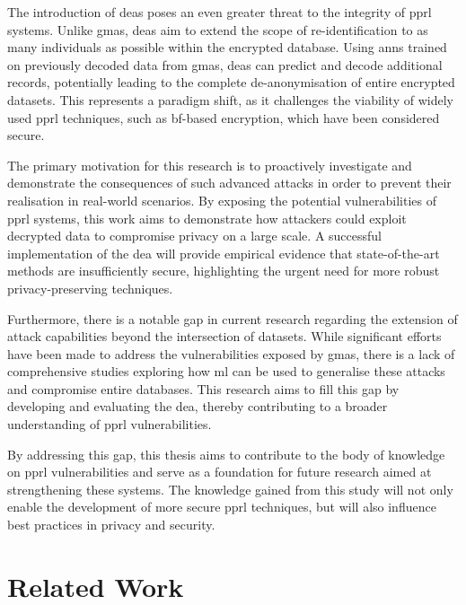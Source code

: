 The introduction of \ac{dea}s poses an even greater threat to the integrity of \ac{pprl} systems. 
Unlike \ac{gma}s, \ac{dea}s aim to extend the scope of re-identification to as many individuals as possible within the encrypted database. 
Using \ac{ann}s trained on previously decoded data from \ac{gma}s, \ac{dea}s can predict and decode additional records, potentially leading to the complete de-anonymisation of entire encrypted datasets. 
This represents a paradigm shift, as it challenges the viability of widely used \ac{pprl} techniques, such as \ac{bf}-based encryption, which have been considered secure.

The primary motivation for this research is to proactively investigate and demonstrate the consequences of such advanced attacks in order to prevent their realisation in real-world scenarios. 
By exposing the potential vulnerabilities of \ac{pprl} systems, this work aims to demonstrate how attackers could exploit decrypted data to compromise privacy on a large scale. 
A successful implementation of the \ac{dea} will provide empirical evidence that state-of-the-art methods are insufficiently secure, highlighting the urgent need for more robust privacy-preserving techniques.

Furthermore, there is a notable gap in current research regarding the extension of attack capabilities beyond the intersection of datasets. 
While significant efforts have been made to address the vulnerabilities exposed by \ac{gma}s, there is a lack of comprehensive studies exploring how \ac{ml} can be used to generalise these attacks and compromise entire databases. 
This research aims to fill this gap by developing and evaluating the \ac{dea}, thereby contributing to a broader understanding of \ac{pprl} vulnerabilities.

By addressing this gap, this thesis aims to contribute to the body of knowledge on \ac{pprl} vulnerabilities and serve as a foundation for future research aimed at strengthening these systems. 
The knowledge gained from this study will not only enable the development of more secure \ac{pprl} techniques, but will also influence best practices in privacy and security.

\section{Related Work}  \label{sec:rel-work}

